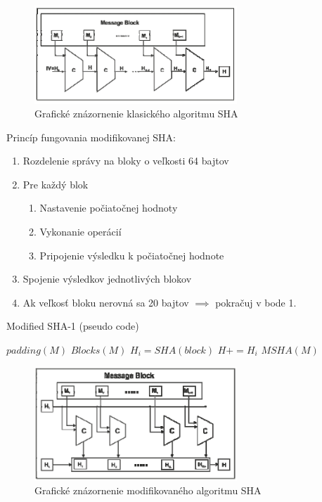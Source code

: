 \documentclass[conference]{IEEEtran}
\begin{document}
\begin{figure}[!h]
\centering
\includegraphics[width=3in]{img/SHA}
\caption{Grafické znázornenie klasického algoritmu SHA}
\end{figure}

Princíp fungovania modifikovanej SHA: 
\begin{enumerate}
	\item{Rozdelenie správy na bloky o veľkosti 64 bajtov}
	\item{Pre každý blok}
	\begin{enumerate}
		\item{Nastavenie počiatočnej hodnoty}
		\item{Vykonanie operácií}
		\item{Pripojenie výsledku k počiatočnej hodnote}
	\end{enumerate}
	\item{Spojenie výsledkov jednotlivých blokov}
	\item{Ak veľkosť bloku nerovná sa 20 bajtov $\implies$ pokračuj v bode 1.}
\end{enumerate}


\begin{algorithm}
   \caption{Modified SHA-1 (pseudo code) \cite{MSHA}}
    \begin{algorithmic}[1]

        \State ${padding(M)}$ 
        \State ${Blocks(M)}$ 
	 
     		\State ${H_i = SHA(block)}$		
     	\EndFor
   	\State ${H += H_i}$    	
   	 ${MSHA(M)}$
   	\EndIf
       \EndFunction
\end{algorithmic}
\end{algorithm}


\begin{figure}[!h]
\centering
\includegraphics[width=3in]{img/MSHA}
\caption{Grafické znázornenie modifikovaného algoritmu SHA}
\end{figure}
\end{document}
